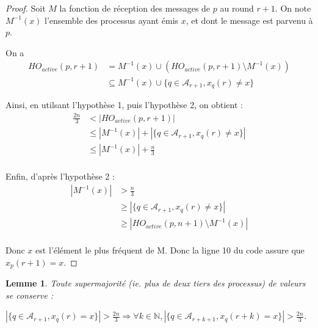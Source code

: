 \documentclass{article}
\newtheorem{lemma}{Lemme}
\begin{document}
\begin{proof}

	Soit $M$ la fonction de réception des messages de $p$ au round $r+1$. On note $M^{-1}(x)$ l'ensemble des processus ayant émis $x$, et dont le message est parvenu à $p$.

	On a
\begin{equation}
\begin{split}
	HO_{active}(p, r+1) & = M^{-1}(x) \cup (HO_{active}(p, r+1) \setminus M^{-1}(x)) \\
	& \subseteq M^{-1}(x) \cup \{ q \in \mathcal{A}_{r+1} , x_q(r) \neq x \}
\end{split}
\end{equation}

	Ainsi, en utilsant l'hypothèse 1, puis l'hypothèse 2, on obtient : 
\begin{equation}
\begin{split}
\frac{2 n}{3} & < | HO_{active}(p, r+1) | \\
		& \leq | M^{-1}(x) | + | \{ q \in \mathcal{A}_{r+1} , x_q(r) \neq x \} | \\
		& \leq | M^{-1}(x) | +  \frac{ n}{3} \\
\end{split}
\end{equation}


	Enfin, d'après l'hypothèse 2 :
\begin{equation}
\begin{split}
| M^{-1}(x) | & > \frac{ n}{3} \\
		& \geq | \{ q \in \mathcal{A}_{r+1} , x_q(r) \neq x \} | \\
		& \geq | HO_{active}(p,n+1) \setminus M^{-1}(x) | \\
\end{split}
\end{equation}

Donc $x$ est l'élément le plus fréquent de M. Donc la ligne 10 du code assure que $x_p(r+1) = x$.

\end{proof}

\begin{lemma}

Toute supermajorité (ie. plus de deux tiers des processus) de valeurs se conserve :

	$ | \{ q \in \mathcal{A}_{r+1} , x_q(r) = x \} | > \frac{2 n}{3} \Rightarrow \forall k \in \mathds{N}, | \{ q \in \mathcal{A}_{r+k+1} , x_q(r+k) = x \} | > \frac{2 n}{3}$.

\end{lemma}
\end{document}
